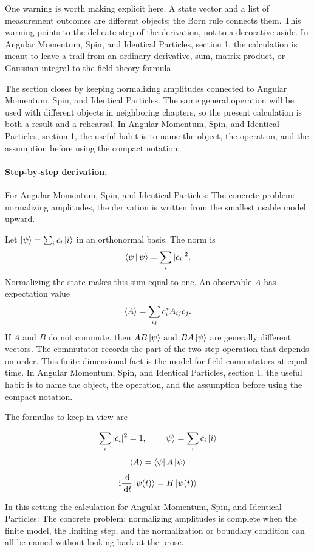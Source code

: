 One warning is worth making explicit here.  A state vector and a list of measurement outcomes are different objects; the Born rule connects them.  This warning points to the delicate step of the derivation, not to a decorative aside.  In Angular Momentum, Spin, and Identical Particles, section 1, the calculation is meant to leave a trail from an ordinary derivative, sum, matrix product, or Gaussian integral to the field-theory formula.

The section closes by keeping normalizing amplitudes connected to Angular Momentum, Spin, and Identical Particles.  The same general operation will be used with different objects in neighboring chapters, so the present calculation is both a result and a rehearsal.  In Angular Momentum, Spin, and Identical Particles, section 1, the useful habit is to name the object, the operation, and the assumption before using the compact notation.



\paragraph{Step-by-step derivation.}

For Angular Momentum, Spin, and Identical Particles: The concrete problem: normalizing amplitudes, the derivation is written from the smallest usable model upward.

Let \(\left|\psi\right\rangle=\sum_i c_i\left|i\right\rangle\) in an orthonormal basis.  The norm is
\[
  \left\langle \psi\,\middle|\,\psi\right\rangle=\sum_i |c_i|^2.
\]
Normalizing the state makes this sum equal to one.  An observable \(A\) has expectation value
\[
  \left\langle A\right\rangle=\sum_{ij}c_i^*A_{ij}c_j.
\]
If \(A\) and \(B\) do not commute, then \(AB\left|\psi\right\rangle\) and \(BA\left|\psi\right\rangle\) are generally different vectors.  The commutator records the part of the two-step operation that depends on order.  This finite-dimensional fact is the model for field commutators at equal time.  In Angular Momentum, Spin, and Identical Particles, section 1, the useful habit is to name the object, the operation, and the assumption before using the compact notation.

The formulas to keep in view are

\[
  \sum_i |c_i|^2=1,\qquad \left|\psi\right\rangle=\sum_i c_i\left|i\right\rangle
\]
\[
  \left\langle A\right\rangle=\left\langle \psi\right|A\left|\psi\right\rangle
\]
\[
  \mathrm i\frac{\,\mathrm d}{\,\mathrm d t}\left|\psi(t)\right\rangle=H\left|\psi(t)\right\rangle
\]

In this setting the calculation for Angular Momentum, Spin, and Identical Particles: The concrete problem: normalizing amplitudes is complete when the finite model, the limiting step, and the normalization or boundary condition can all be named without looking back at the prose.




